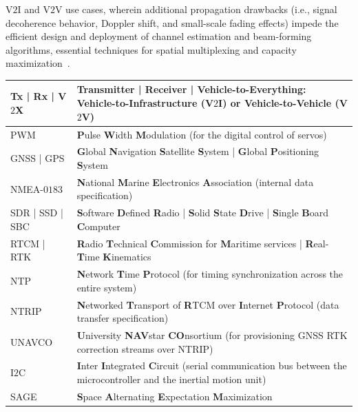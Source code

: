 \documentclass[10pt, twocolumn]{IEEEtran}
\renewcommand{\tabcolsep}{2pt}
\begin{document}
V$2$I and V$2$V use cases, wherein additional propagation drawbacks (i.e., signal decoherence behavior, Doppler shift, and small-scale fading effects) impede the efficient design and deployment of channel estimation and beam-forming algorithms, essential techniques for spatial multiplexing and capacity maximization~\cite{VehicularBeamSelection, CVBeamAlignmentV2X}.\\
\renewcommand{\tabcolsep}{10pt}
\begin{table} [tb]
	\centering
	\scriptsize
	\begin{tabular}{|l||l|}
		\hline
        Tx | Rx | V$2$X & Transmitter | Receiver | Vehicle-to-Everything: \textbf{V}ehicle-to-\textbf{I}nfrastructure (V$2$I) or \textbf{V}ehicle-to-\textbf{V}ehicle (V$2$V)\\
		\hline
        \hline
        PWM & \textbf{P}ulse \textbf{W}idth \textbf{M}odulation (for the digital control of servos)\\
		\hline
        GNSS | GPS & \textbf{G}lobal \textbf{N}avigation \textbf{S}atellite \textbf{S}ystem | \textbf{G}lobal \textbf{P}ositioning \textbf{S}ystem\\
        \hline
		NMEA-$0183$ & \textbf{N}ational \textbf{M}arine \textbf{E}lectronics \textbf{A}ssociation (internal data specification)\\
		\hline
        SDR | SSD | SBC & \textbf{S}oftware \textbf{D}efined \textbf{R}adio | \textbf{S}olid \textbf{S}tate \textbf{D}rive | \textbf{S}ingle \textbf{B}oard \textbf{C}omputer\\
		\hline
        RTCM | RTK & \textbf{R}adio \textbf{T}echnical \textbf{C}ommission for \textbf{M}aritime services | \textbf{R}eal-\textbf{T}ime \textbf{K}inematics\\
		\hline
        NTP & \textbf{N}etwork \textbf{T}ime \textbf{P}rotocol (for timing synchronization across the entire system)\\
        \hline
		NTRIP & \textbf{N}etworked \textbf{T}ransport of \textbf{R}TCM over \textbf{I}nternet \textbf{P}rotocol (data transfer specification)\\
		\hline
		UNAVCO & \textbf{U}niversity \textbf{NAV}star \textbf{CO}nsortium (for provisioning GNSS RTK correction streams over NTRIP)\\
		\hline
		I$2$C & \textbf{I}nter \textbf{I}ntegrated \textbf{C}ircuit (serial communication bus between the microcontroller and the inertial motion unit)\\
		\hline
        \hline
        SAGE & \textbf{S}pace \textbf{A}lternating \textbf{E}xpectation \textbf{M}aximization\\

\end{tabular}
\end{table}
\end{document}
